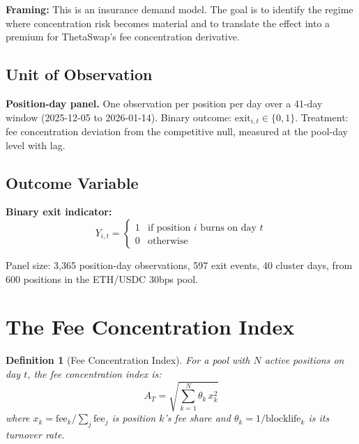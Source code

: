 \documentclass[11pt,a4paper]{article}
\newtheorem{definition}{Definition}
\begin{document}
\textbf{Framing:} This is an insurance demand model. The goal is to identify
the regime where concentration risk becomes material and to translate the
effect into a premium for ThetaSwap's fee concentration derivative.

\subsection{Unit of Observation}

\textbf{Position-day panel.} One observation per position per day over a
41-day window (2025-12-05 to 2026-01-14). Binary outcome: $\text{exit}_{i,t}
\in \{0, 1\}$. Treatment: fee concentration deviation from the competitive
null, measured at the pool-day level with lag.

\subsection{Outcome Variable}

\textbf{Binary exit indicator:}
\begin{equation}\label{eq:outcome}
  Y_{i,t} = \begin{cases}
    1 & \text{if position } i \text{ burns on day } t \\
    0 & \text{otherwise}
  \end{cases}
\end{equation}

Panel size: 3{,}365 position-day observations, 597 exit events, 40 cluster
days, from 600 positions in the ETH/USDC 30bps pool.


\section{The Fee Concentration Index}\label{sec:a-t}

\begin{definition}[Fee Concentration Index]\label{def:a-t}
For a pool with $N$ active positions on day $t$, the fee concentration
index is:
\begin{equation}\label{eq:a-t}
  A_T = \sqrt{\sum_{k=1}^{N} \theta_k \, x_k^2}
\end{equation}
where $x_k = \text{fee}_k / \sum_j \text{fee}_j$ is position $k$'s fee
share and $\theta_k = 1/\text{blocklife}_k$ is its turnover rate.
\end{definition}
\end{document}
